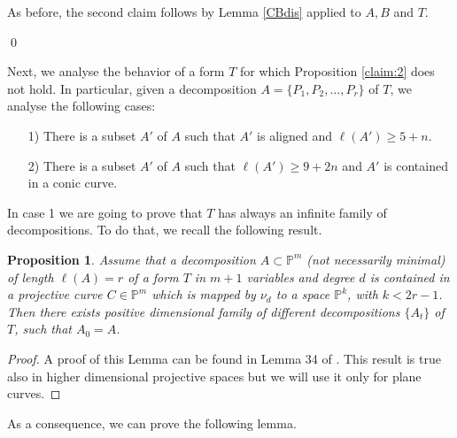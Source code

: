 \documentclass[a4paper,10pt,oneside]{article}
\theoremstyle{casep}
\newcommand{\Pj}{\mathbb{P}}
\newtheorem{proposition}[theorem]{Proposition}
\theoremstyle{definition}
\begin{document}
As before, the second claim follows by Lemma \ref{CBdis} applied to $A,B$ and $T$.


\hfil\qed

\medskip
Next, we analyse the behavior of a form $ T $ for which Proposition \ref{claim:2} does not hold. In particular, given a decomposition $ A= \{ P_1,P_2, \dots,P_r\} $ of $ T $, we analyse the following cases:
\begin{itemize}
	\item[1)] There is a subset $ A' $ of $ A $ such that $ A' $ is aligned and $ \ell(A')\geq 5+n $.
	\item[2)] There is a subset $ A' $ of $ A $ such that $ \ell(A')\geq 9+2n $ and $ A' $ is contained in a conic curve.
	
\end{itemize}

In case 1 we are going to prove that $T$ has always an infinite family of decompositions. To do that, we recall the following result.

\begin{proposition}
	\label{proposition:qudis}
	Assume that a decomposition $A \subset \Pj^m$ (not necessarily minimal) of length $\ell(A)=r$ of a form $T$ in $ m+1 $ variables and degree $ d $ is contained in a projective curve $C \in \Pj^m $ 
	which is mapped by $\nu_d$ to a space $\Pj^k$, with $k < 2r-1$. Then there exists positive dimensional family 
	of different decompositions $ \{ A_t \}$ of $T$, such that $A_0 = A$.
\end{proposition}
\begin{proof} A proof of this Lemma can be found in Lemma 34 of \cite{bergimid}. This result is true also in higher dimensional projective spaces but we will use it only for plane curves.
	
\end{proof}

As a consequence, we can prove the following lemma.
\end{document}
